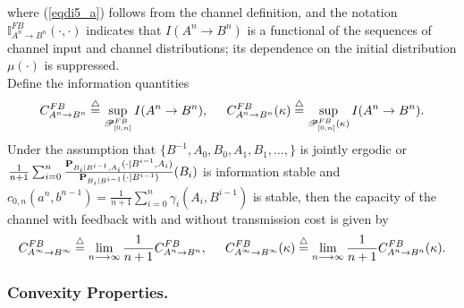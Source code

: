 \documentclass[11pt, a4paper, journal,onecolumn]{IEEEtran}
\newcommand{\sr}{\stackrel}
\newcommand{\rar}{\rightarrow}
\newcommand{\tri}{\sr{\triangle}{=}}
\newcommand{\hso}{\hspace{.1in}}
\newcommand{\hst}{\hspace{.2in}}
\begin{document}
where  (\ref{eqdi5_a}) follows from the channel definition, and  the notation ${\mathbb I}_{A^n \rar B^n}^{FB}(\cdot, \cdot)$ indicates that $I(A^n\rar B^n)$ is a functional of the sequences of channel input and channel distributions; its dependence on the  initial distribution $\mu(\cdot)$ is suppressed.\\
Define the information quantities 
\begin{align}
C_{A^n \rar B^n}^{FB} \tri  \sup_{ {\cal P}_{[0,n]}^{FB}  }I(A^n\rar B^n), \hst C_{A^n \rar B^n}^{FB}(\kappa) \tri  \sup_{ {\cal P}_{[0,n]}^{FB}(\kappa)  }I(A^n\rar B^n). \label{FBLF_1}
\end{align}
Under the assumption that  $\{B^{-1}, A_0, B_0, A_1, B_1, \ldots, \}$ is  jointly ergodic or  $\frac{1}{n+1} \sum_{i=0}^n \frac{{\bf P}_{B_i|B^{i-1}, A_i}(\cdot|B^{i-1}, A_i)}{{\bf  P}_{B_i|B^{i-1}}(\cdot|B^{i-1})}(B_i)$ is information stable \cite{dubrushin1958,tatikonda2000} and $c_{0,n}(a^n, b^{n-1})=\frac{1}{n+1}\sum_{i=0}^{n}\gamma_i(A_i,B^{i-1})$ is stable, then the capacity of the channel with  feedback with and without transmission cost   is given by
\begin{align}
 C_{A^\infty \rar B^\infty}^{FB} \tri \lim_{n \longrightarrow  \infty}{\frac{1}{n+1}} C_{A^n \rar B^n}^{FB}, \hst C_{A^\infty \rar B^\infty}^{FB}(\kappa) \tri \lim_{n \longrightarrow  \infty}{\frac{1}{n+1}} C_{A^n \rar B^n}^{FB}(\kappa).\label{feed_capa}
\end{align}

\subsubsection{Convexity Properties.}
\end{document}
